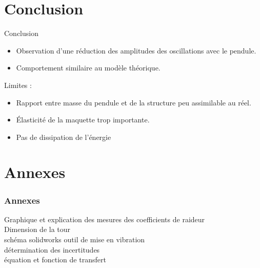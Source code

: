 \documentclass{beamer}
\begin{document}
	
\section{Conclusion}
\begin{frame}{Conclusion}
	\begin{itemize}
		\item Observation d'une réduction des amplitudes des oscillations avec le pendule.
		\item Comportement similaire au modèle théorique.\vspace{12pt}
	\end{itemize}
Limites :
	\begin{itemize}
		\item Rapport entre masse du pendule et de la structure peu assimilable au réel.
		\item Élasticité de la maquette trop importante.
		\item Pas de dissipation de l'énergie 

	\end{itemize}
\end{frame}	
	
	
\section{Annexes}
	
	\begin{frame}
		\frametitle{Annexes}
		Graphique et explication des mesures des coefficients de raideur\\
		Dimension de la tour\\
		schéma solidworks outil de mise en vibration \\
		détermination des incertitudes\\
		équation et fonction de transfert\\
		
	\end{frame}
\end{document}
